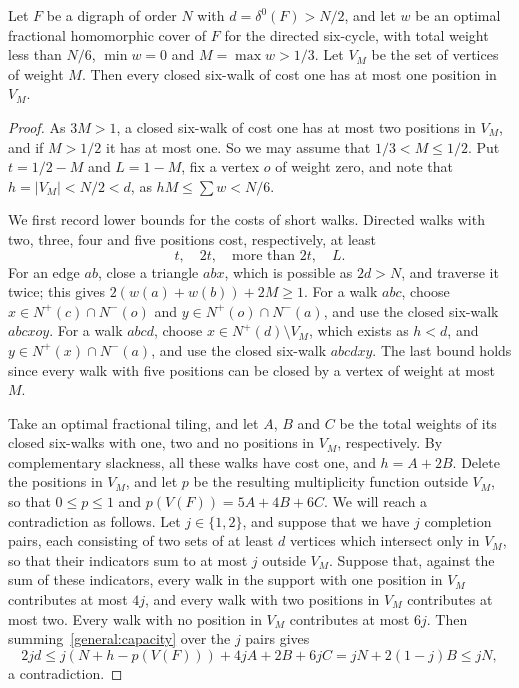 \begin{lemma}\label{c6:lem:onehigh}
Let $F$ be a digraph of order $N$ with $d=\delta^0(F)>N/2$, and let $w$ be an optimal fractional homomorphic cover of $F$ for the directed six-cycle, with total weight less than $N/6$, $\min w=0$ and $M=\max w>1/3$. Let $V_M$ be the set of vertices of weight $M$.
Then every closed six-walk of cost one has at most one position in $V_M$.
\end{lemma}
\begin{proof}
As $3M>1$, a closed six-walk of cost one has at most two positions in $V_M$, and if $M>1/2$ it has at most one. So we may assume that $1/3<M\le1/2$. Put $t=1/2-M$ and $L=1-M$, fix a vertex $o$ of weight zero, and note that $h=|V_M|<N/2<d$, as $hM\le\sum w<N/6$.

We first record lower bounds for the costs of short walks. Directed walks with
two, three, four and five positions cost, respectively, at least
\begin{equation}\label{c6:eq:basiccosts}
                 t,\quad2t,\quad\text{more than }2t,\quad L.
\end{equation}
For an edge $ab$, close a triangle $abx$, which is possible as $2d>N$, and traverse it twice; this gives $2(w(a)+w(b))+2M\ge1$.
For a walk $abc$, choose $x\in N^+(c)\cap N^-(o)$ and
$y\in N^+(o)\cap N^-(a)$, and use the closed six-walk $abcxoy$.
For a walk $abcd$, choose $x\in N^+(d)\setminus V_M$, which exists as $h<d$, and
$y\in N^+(x)\cap N^-(a)$, and use the closed six-walk $abcdxy$.
The last bound holds since every walk with five positions can be closed by a vertex of weight at most $M$.

Take an optimal fractional tiling, and let $A$, $B$ and $C$ be the total weights of its closed six-walks with one, two and no positions in $V_M$, respectively. By complementary slackness, all these walks have cost one, and
$h=A+2B$. Delete the positions in $V_M$, and let $p$ be the resulting multiplicity function outside $V_M$, so that $0\le p\le1$ and $p(V(F))=5A+4B+6C$.
We will reach a contradiction as follows. Let $j\in\{1,2\}$, and suppose that we have $j$ completion pairs, each consisting of two sets of at least $d$ vertices which intersect only in $V_M$, so that their indicators sum to at most $j$ outside $V_M$. Suppose that, against the sum of these indicators, every walk in the support with one position in $V_M$ contributes at most $4j$, and every walk with two positions in $V_M$ contributes at most two. Every walk with no position in $V_M$ contributes at most $6j$. Then summing~\eqref{general:capacity} over the $j$ pairs gives
\begin{equation}\label{c6:eq:fcount}
 2jd\le j(N+h-p(V(F)))+4jA+2B+6jC=jN+2(1-j)B\le jN,
\end{equation}
a contradiction.


\end{proof}
